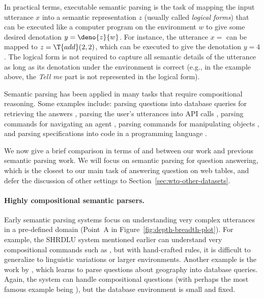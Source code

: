 In practical terms,
executable semantic parsing
is the task of mapping the input utterance $x$
into a semantic representation $z$
(usually called \emph{logical forms})
that can be executed like a computer program
on the environment $w$
to give some desired denotation $y = \deno{z}{w}$.
For instance, the utterance $x =$ 
can be mapped to $z = \T{add}(2, 2)$, which can be executed
to give the denotation $y = 4$.
The logical form is not required to capture
all semantic details of the utterance
as long as its denotation under the environment is correct
(e.g., in the example above,
the \emph{Tell me} part is not represented
in the logical form).

Semantic parsing has been applied in many tasks
that require compositional reasoning.
Some examples include:
parsing questions into database queries for retrieving the answers
\cite{zelle96geoquery,zettlemoyer07relaxed,berant2013freebase,dong2016logical,zhong2017seq2sql},
parsing the user's utterances into API calls
\cite{quirk2015language},
parsing commands for navigating an agent
\cite{chen11navigate,tellex2011understanding,artzi2013weakly,andreas2015alignment},
parsing commands for manipulating objects
\cite{guu2017bridging,fried2018unified},
and parsing specifications into code in a programming language
\cite{kushman2013regex,ling2016latent,yin2017syntactic,rabinovich2017abstract,iyer2018mapping}.

We now give a brief comparison
in terms of \Breadth
and \Depth
between our work
and previous semantic parsing work.
We will focus on semantic parsing for question answering,
which is the closest to our main task of
answering question on web tables,
and defer the discussion of other settings to
Section~\ref{sec:wtq-other-datasets}.

\paragraph{Highly compositional semantic parsers.}

Early semantic parsing systems focus on
understanding very complex utterances in a
pre-defined domain
(Point~A in Figure~\ref{fig:depth-breadth-plot}).
For example, the
SHRDLU system \cite{winograd1972language}
mentioned earlier
can understand very compositional commands
such as
, but with hand-crafted rules,
it is difficult to generalize to linguistic variations
or larger environments.
Another example is the work by \citet{zelle96geoquery},
which learns to parse questions about geography
into database queries.
Again, the system can handle compositional questions
(with perhaps the most famous example being
), but the database environment
is small and fixed.

